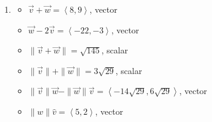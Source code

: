 \begin{enumerate}
\begin{multicols}{2}
\begin{itemize}
\end{itemize}

\end{multicols}

\begin{multicols}{2}

\begin{itemize}

\item $\| \vec{v} \| \vec{w} - \| \vec{w} \| \vec{v}  = \left<-6\sqrt{5},6\sqrt{5}\right>$, vector
\item $\|w\| \hat{v}= \left<4, -2 \right>$, vector

\end{itemize}

\end{multicols}

\item  

\begin{multicols}{2}

\begin{itemize}

\item  $\vec{v} + \vec{w} = \left<8,9\right> $, vector
\item  $\vec{w}  - 2\vec{v}  = \left<-22, -3 \right>$, vector

\end{itemize}

\end{multicols}

\begin{multicols}{2}

\begin{itemize}

\item $\| \vec{v} + \vec{w} \| = \sqrt{145}$, scalar
\item  $\| \vec{v} \| + \| \vec{w}\| = 3\sqrt{29}$, scalar

\end{itemize}

\end{multicols}

\begin{multicols}{2}

\begin{itemize}

\item $\| \vec{v} \| \vec{w} - \| \vec{w} \| \vec{v}  = \left<-14\sqrt{29},6\sqrt{29}\right>$, vector
\item $\|w\| \hat{v}= \left<5, 2 \right>$, vector


\end{itemize}
\end{multicols}
\end{enumerate}
